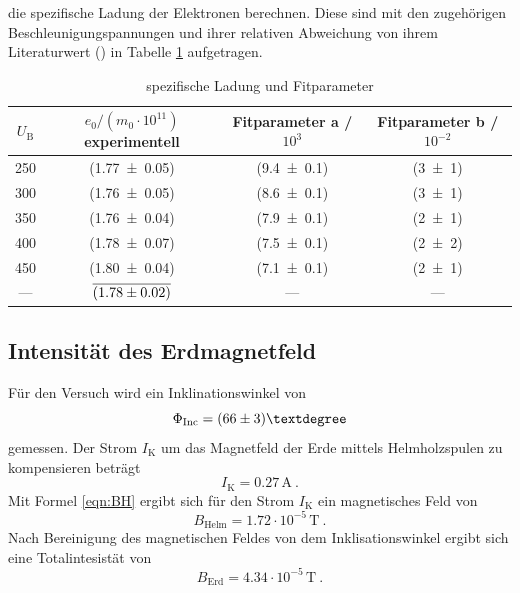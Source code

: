 die spezifische Ladung der Elektronen berechnen. Diese sind mit den zugehörigen Beschleunigungspannungen und ihrer relativen Abweichung von ihrem Literaturwert (\cite{spez}) in Tabelle \ref{tab:e0m0} aufgetragen.
\begin{table}
  \centering
  \begin{tabular}{c| c c c}
    \toprule
    $U_\text{B}$  & $e_0/(m_0 \cdot 10^{11}) $ experimentell & Fitparameter a / $10^3$ & Fitparameter b / $10^{-2}$\\
    \midrule
    250	& (\num{1.77 +- 0.05}) &(\num{9.4 +- 0.1}) & (\num{3 +- 1})	 \\
    300	& (\num{1.76 +- 0.05}) &(\num{8.6 +- 0.1}) & (\num{3 +- 1})	 \\
    350	& (\num{1.76 +- 0.04}) &(\num{7.9 +- 0.1}) & (\num{2 +- 1})	 \\
    400	& (\num{1.78 +- 0.07}) &(\num{7.5 +- 0.1}) & (\num{2 +- 2})	 \\
    450	& (\num{1.80 +- 0.04}) &(\num{7.1 +- 0.1}) & (\num{2 +- 1})	 \\
    \midrule
    --- 	& $\overline{(\num{1.78 +- 0.02})}$ & ---  & --- \\
    \bottomrule
  \end{tabular}
  \caption{spezifische Ladung und Fitparameter}
  \label{tab:e0m0}
\end{table}
\subsection{Intensität des Erdmagnetfeld}
Für den Versuch wird ein Inklinationswinkel von
\begin{equation}
  \Phi_\text{Inc} = (\num{66 +-3})°
  \label{eqn:Inc}
\end{equation}
gemessen. Der Strom $I_\text{K}$ um das Magnetfeld der Erde mittels Helmholzspulen zu kompensieren beträgt
\begin{equation}
  I_\text{K} = 0.27 \, \text{A} \ .
  \label{IK}
\end{equation}
Mit Formel \eqref{eqn:BH} ergibt sich für den Strom $I_\text{K}$ ein magnetisches Feld von
\begin{equation}
  B_\text{Helm} = 1.72 \cdot 10^{-5} \, \text{T} \ .
  \label{eqn:Binc}
\end{equation}
Nach Bereinigung des magnetischen Feldes von dem Inklisationswinkel ergibt sich eine Totalintesistät von
\begin{equation}
  B_\text{Erd} = 4.34 \cdot 10^{-5} \, \text{T} \ .
  \label{eqn:Berd}
\end{equation}
